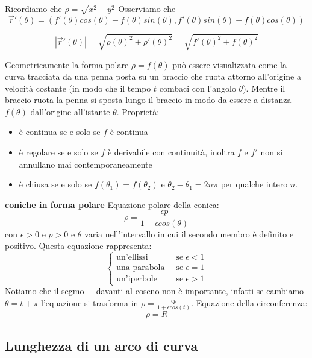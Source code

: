 Ricordiamo che $\rho = \sqrt{x^2 + y^2}$
Osserviamo che 
\[
    \vec{r}'(\theta) = (f'(\theta) cos(\theta)- f(\theta)sin(\theta), f'(\theta) sin(\theta) - f(\theta)cos(\theta))
\]
\begin{tcolorbox}
\[
    |\vec{r}'(\theta)| = \sqrt{\rho(\theta)^2 + \rho'(\theta)^2} = \sqrt{f'(\theta)^2 + f(\theta)^2}
\]
\end{tcolorbox}
Geometricamente la forma polare $\rho = f(\theta)$ può essere visualizzata come la curva tracciata da una penna posta su un braccio che ruota attorno all'origine a velocità costante (in modo che il tempo $t$ combaci con l'angolo $\theta$). Mentre il braccio ruota la penna si sposta lungo il braccio in modo da essere a distanza $f(\theta)$ dall'origine all'istante $\theta$.\newline
\newline
Proprietà:
\begin{itemize}
    \item è continua se e solo se $f$ è continua
    \item è regolare se e solo se $f$ è derivabile con continuità, inoltra $f$ e $f'$ non si annullano mai contemporaneamente
    \item è chiusa se e solo se $f(\theta_1) = f(\theta_2)$ e $\theta_2 - \theta_1 = 2n\pi$ per qualche intero $n$.
\end{itemize}
\textbf{coniche in forma polare}\newline
Equazione polare della conica:
\[
        \rho = \frac{\epsilon p}{1- \epsilon cos(\theta)}
\]
con $\epsilon > 0$ e $p> 0$ e $\theta$ varia nell'intervallo in cui il secondo membro è definito e positivo.\newline
Questa equazione rappresenta:
\[
    \begin{cases}
        \text{un'ellissi} \;\; &\text{se} \; \epsilon< 1\\
        \text{una parabola} \;\; &\text{se} \; \epsilon= 1\\
        \text{un'iperbole} \;\; &\text{se} \; \epsilon> 1
    \end{cases}
\]
Notiamo che il segmo $-$ davanti al coseno non è importante, infatti se cambiamo $\theta = t + \pi$ l'equazione si trasforma in $\rho = \frac{\epsilon p}{1 + \epsilon cos(t)}$.\newline
Equazione della circonferenza:
\[
        \rho = R
\]
\subsection{Lunghezza di un arco di curva}
